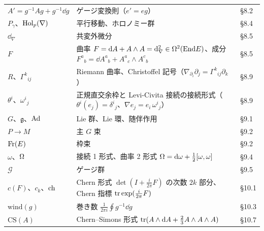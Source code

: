 \begin{longtable}{@{}p{4.7cm}p{8.0cm}>{\raggedright\arraybackslash}p{2.1cm}@{}}
$A'=g^{-1}Ag+g^{-1}\dd g$ & ゲージ変換則（$e'=eg$） & §8.2 \\
$P_\gamma$、$\operatorname{Hol}_p(\nabla)$ & 平行移動、ホロノミー群 & §8.4 \\
$\dd_\nabla$ & 共変外微分 & §8.5 \\
$F$ & 曲率 $F=\mathrm{d} A+A\wedge A=\mathrm{d}_\nabla^2\in\Omega^2(\mathrm{End} E)$、成分 $F^a{}_b=\dd A^a{}_b+A^a{}_c\wedge A^c{}_b$ & §8.5 \\
$R$、$\Gamma^k{}_{ij}$ & Riemann 曲率、Christoffel 記号（$\nabla_{\partial_i}\partial_j=\Gamma^k{}_{ij}\partial_k$） & §8.9 \\
$\theta^i$、$\omega^i{}_j$ & 正規直交余枠と Levi-Civita 接続の接続形式（$\theta^i(e_j)=\delta^i{}_j$、$\nabla e_j=e_i\,\omega^i{}_j$） & §8.9 \\
$G$、$\mathfrak g$、$\mathrm{Ad}$ & Lie 群、Lie 環、随伴作用 & §9.1 \\
$P\to M$ & 主 $G$ 束 & §9.2 \\
$\operatorname{Fr}(E)$ & 枠束 & §9.2 \\
$\omega$、$\Omega$ & 接続 1 形式、曲率 2 形式 $\Omega=\mathrm{d}\omega+\frac12[\omega,\omega]$ & §9.4 \\
$\mathcal G$ & ゲージ群 & §9.5 \\
$c(F)$、$c_k$、$\mathrm{ch}$ & Chern 形式 $\det(I+\frac{i}{2\pi}F)$ の次数 $2k$ 部分、Chern 指標 $\operatorname{tr}\exp(\frac{i}{2\pi}F)$ & §10.1 \\
$\mathrm{wind}(g)$ & 巻き数 $\frac1{2\pi i}\oint g^{-1}\dd g$ & §10.3 \\
$\mathrm{CS}(A)$ & Chern--Simons 形式 $\operatorname{tr}(A\wedge\mathrm{d} A+\frac23A\wedge A\wedge A)$ & §10.7 \\
\bottomrule
\end{longtable}
\endgroup

